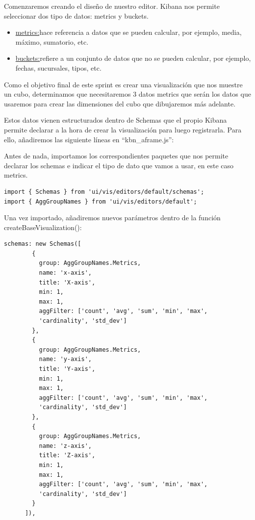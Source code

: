 \documentclass[a4paper, 12pt]{book}
\begin{document}
Comenzaremos creando el diseño de nuestro editor. Kibana nos permite seleccionar dos tipo de datos: metrics y buckets.
\begin{itemize}
    \item \underline{metrics:}hace referencia a datos que se pueden calcular, por ejemplo, media, máximo, sumatorio, etc.
    \item \underline{buckets:}refiere a un conjunto de datos que no se pueden calcular, por ejemplo, fechas, sucursales, tipos, etc.
\end{itemize}

Como el objetivo final de este sprint es crear una visualización que nos muestre un cubo, determinamos que necesitaremos 3 datos metrics que serán los datos que usaremos para crear las dimensiones del cubo que dibujaremos más adelante.

Estos datos vienen estructurados dentro de Schemas que el propio Kibana permite declarar a la hora de crear la visualización para luego registrarla. Para ello, añadiremos las siguiente líneas en “kbn\_aframe.js”:

Antes de nada, importamos los correspondientes paquetes que nos permite declarar los schemas e indicar el tipo de dato que vamos a usar, en este caso metrics.

\begin{lstlisting}[frame=single]
import { Schemas } from 'ui/vis/editors/default/schemas';
import { AggGroupNames } from 'ui/vis/editors/default';
\end{lstlisting}

Una vez importado, añadiremos nuevos parámetros dentro de la función createBaseVisualization():

\begin{lstlisting}[frame=single]
schemas: new Schemas([
        {
          group: AggGroupNames.Metrics,
          name: 'x-axis',
          title: 'X-axis',
          min: 1,
          max: 1,
          aggFilter: ['count', 'avg', 'sum', 'min', 'max', 
          'cardinality', 'std_dev']
        },
        {
          group: AggGroupNames.Metrics,
          name: 'y-axis',
          title: 'Y-axis',
          min: 1,
          max: 1,
          aggFilter: ['count', 'avg', 'sum', 'min', 'max', 
          'cardinality', 'std_dev']
        },
        {
          group: AggGroupNames.Metrics,
          name: 'z-axis',
          title: 'Z-axis',
          min: 1,
          max: 1,
          aggFilter: ['count', 'avg', 'sum', 'min', 'max', 
          'cardinality', 'std_dev']
        }
      ]),
\end{lstlisting}
\end{document}
